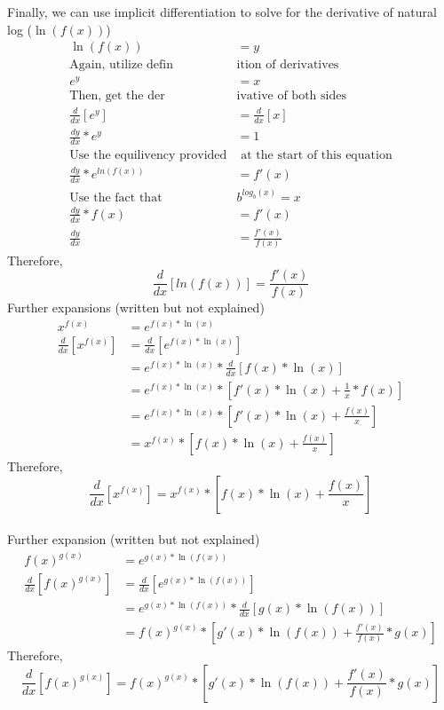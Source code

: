 \documentclass{article}
\newcommand{\ddx}{\frac{d}{dx}}
\newcommand{\dydx}{\frac{dy}{dx}}
\begin{document}
Finally, we can use implicit differentiation to solve for the derivative of natural log ($\ln(f(x))$)
	\begin{align*}
		\ln(f(x)) &= y \\
		\text{Again, utilize defin}&\text{ition of derivatives} \\
		e^y &= x \\
		\text{Then, get the der}&\text{ivative of both sides} \\
		\ddx[e^y] &= \ddx[x] \\
		\dydx * e^y &= 1 \\
		\text{Use the equilivency provided}&\text{ at the start of this equation} \\
		\dydx * e^{ln(f(x))} &= f'(x) \\
		\text{Use the fact that }& b^{log_b(x)} = x \\
		\dydx * f(x) &= f'(x) \\
		\dydx &= \frac{f'(x)}{f(x)}
	\end{align*}
Therefore,
	\begin{equation}
		\ddx[ln(f(x))] = \frac{f'(x)}{f(x)}
	\end{equation}
Further expansions (written but not explained)
	\begin{align*}
		x^{f(x)} &= e^{f(x)*\ln(x)} \\
		\ddx[x^{f(x)}] &= \ddx[e^{f(x)*\ln(x)}] \\
		&= e^{f(x)*\ln(x)} * \ddx[f(x) * \ln(x)] \\
		&= e^{f(x)*\ln(x)} * [f'(x) * \ln(x) + \frac{1}{x} * f(x)] \\
		&= e^{f(x)*\ln(x)} * [f'(x)*\ln(x) + \frac{f(x)}{x}] \\
		&= x^{f(x)} * [f(x)*\ln(x) + \frac{f(x)}{x}]
	\end{align*}
Therefore,
	\begin{equation}
		\ddx[x^{f(x)}] = x^{f(x)} * [f(x)*\ln(x) + \frac{f(x)}{x}]
	\end{equation} \\
Further expansion (written but not explained)
	\begin{align*}
		f(x)^{g(x)} &= e^{g(x)*\ln(f(x))} \\
		\ddx[f(x)^{g(x)}] &= \ddx[e^{g(x)*\ln(f(x))}] \\
		&= e^{g(x)*\ln(f(x))} * \ddx[g(x)*\ln(f(x))] \\
		&= f(x)^{g(x)} * [g'(x)*\ln(f(x)) + \frac{f'(x)}{f(x)}*g(x)]
	\end{align*}
Therefore,
	\begin{equation}
		\ddx[f(x)^{g(x)}] = f(x)^{g(x)} * [g'(x)*\ln(f(x)) + \frac{f'(x)}{f(x)}*g(x)]
	\end{equation}
\end{document}
